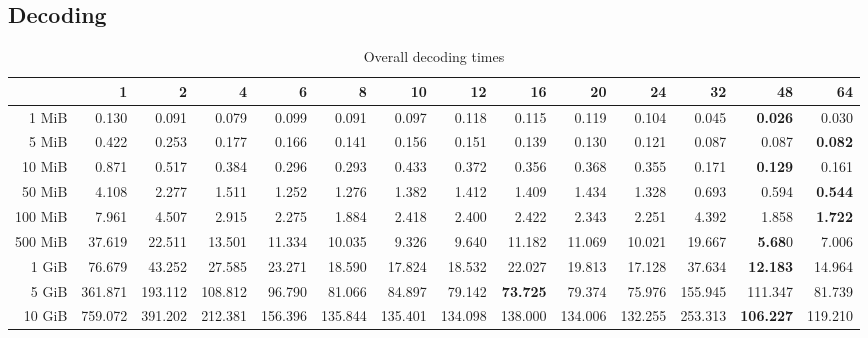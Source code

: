 \subsection{Decoding}
\begin{table}[!h]
	\centering
	\caption{Overall decoding times}
	\begin{tabular}{rrrrrrrrrrrrrr}
		\toprule
		\diagbox[width=7em]{Size}{Threads} &      1  &      2  &      4  &      6  &      8  &      10 &      12 &      16 &      20 &      24 &      32 &      48 &      64 \\
		\midrule
		1 MiB   &   0.130 &   0.091 &   0.079 &   0.099 &   0.091 &   0.097 &   0.118 &   0.115 &   0.119 &   0.104 &   0.045 &   \textbf{0.026} &   0.030 \\
		5 MiB   &   0.422 &   0.253 &   0.177 &   0.166 &   0.141 &   0.156 &   0.151 &   0.139 &   0.130 &   0.121 &   0.087 &   0.087 &   \textbf{0.082} \\
		10 MiB  &   0.871 &   0.517 &   0.384 &   0.296 &   0.293 &   0.433 &   0.372 &   0.356 &   0.368 &   0.355 &   0.171 &   \textbf{0.129} &   0.161 \\
		50 MiB  &   4.108 &   2.277 &   1.511 &   1.252 &   1.276 &   1.382 &   1.412 &   1.409 &   1.434 &   1.328 &   0.693 &   0.594 &   \textbf{0.544} \\
		100 MiB &   7.961 &   4.507 &   2.915 &   2.275 &   1.884 &   2.418 &   2.400 &   2.422 &   2.343 &   2.251 &   4.392 &   1.858 &   \textbf{1.722} \\
		500 MiB &  37.619 &  22.511 &  13.501 &  11.334 &  10.035 &   9.326 &   9.640 &  11.182 &  11.069 &  10.021 &  19.667 &   \textbf{5.68}0 &   7.006 \\
		1 GiB   &  76.679 &  43.252 &  27.585 &  23.271 &  18.590 &  17.824 &  18.532 &  22.027 &  19.813 &  17.128 &  37.634 &  \textbf{12.183} &  14.964 \\
		5 GiB   & 361.871 & 193.112 & 108.812 &  96.790 &  81.066 &  84.897 &  79.142 &  \textbf{73.725} &  79.374 &  75.976 & 155.945 & 111.347 &  81.739 \\
		10 GiB  & 759.072 & 391.202 & 212.381 & 156.396 & 135.844 & 135.401 & 134.098 & 138.000 & 134.006 & 132.255 & 253.313 & \textbf{106.227} & 119.210 \\
		\bottomrule
	\end{tabular}
\end{table}

